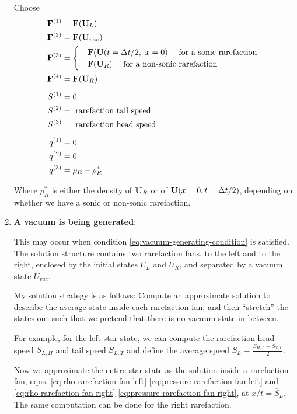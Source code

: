 \begin{enumerate}
			Choose 
			\begin{align*}
				\mathbf{F}^{(1)} &= \mathbf{F}(\mathbf{U}_L)\\
				\mathbf{F}^{(2)} &= \mathbf{F}(\mathbf{U}_{vac})\\
				\mathbf{F}^{(3)} &= \begin{cases}
								&\mathbf{F}(\mathbf{U}(t = \Delta t/2, \ x = 0) \quad \text{ for a sonic rarefaction } \\
								&\mathbf{F}(\mathbf{U}_R) \quad \text{ for a non-sonic rarefaction } \\
							\end{cases}\\
				\mathbf{F}^{(4)} &= \mathbf{F}(\mathbf{U}_R)\\[.5em]
				S^{(1)} &= 0\\
				S^{(2)} &= \text{ rarefaction tail speed}\\
				S^{(3)} &= \text{ rarefaction head speed}\\[.5em]
				q^{(1)} &= 0\\
				q^{(2)} &= 0\\
				q^{(3)} &= \rho_R - \rho_R^*\\							
			\end{align*}
			
			Where $\rho^*_R$ is either the density of $\mathbf{U}_R$ or of $\mathbf{U}(x = 0, t = \Delta t/2)$, depending on whether we have a sonic or non-sonic rarefaction.
			
	
	\item 	\textbf{A vacuum is being generated}:
	
			This may occur when condition \ref{eq:vacuum-generating-condition} is satisfied.
			The solution structure contains two rarefaction fans, to the left and to the right, enclosed by the initial states $U_L$ and $U_R$, and separated by a vacuum state $U_{vac}$.
			
			My solution strategy is as follows:
			Compute an approximate solution to describe the average state inside each rarefaction fan, and then ``stretch'' the states out such that we pretend that there is no vacuum state in between.
			
			For example, for the left star state, we can compute the rarefaction head speed $S_{L,H}$ and tail speed $S_{L,T}$ and define the average speed $\overline{S}_L = \frac{S_{H,L} + S_{T,L}}{2}$.
			
			Now we approximate the entire star state as the solution inside a rarefaction fan, eqns. \ref{eq:rho-rarefaction-fan-left}-\ref{eq:pressure-rarefaction-fan-left} and \ref{eq:rho-rarefaction-fan-right}-\ref{eq:pressure-rarefaction-fan-right}, at $x/t = \overline{S}_L$.
			The same computation can be done for the right rarefaction.
			

\end{enumerate}
